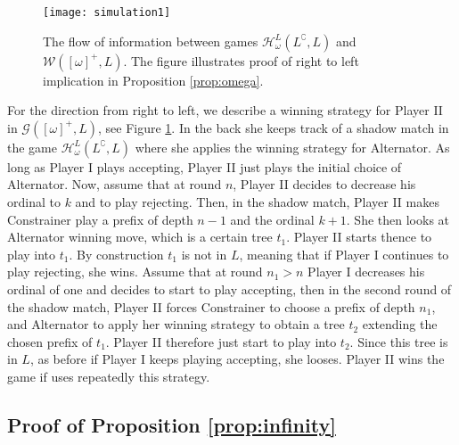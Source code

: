 \begin{figure}
\begin{center}
\texttt{[image: simulation1]}
\caption{The flow of information between games $\mathcal{H}^{L}_\omega(L^\complement, L)$ and $\mathcal{W}([\omega]^+, L)$. The figure illustrates proof of right to left implication in Proposition \ref{prop:omega}. 
\label{myfig1} }
\end{center}
\end{figure}


For the direction from right to left, we describe a winning strategy for Player II in $\mathcal{G}([\omega]^+, L)$, see Figure \ref{myfig1}. In the back she keeps track of a shadow match in the game $\mathcal{H}^{L}_\omega(L^\complement, L)$ where she applies the  winning strategy for Alternator. 
As long as Player I plays accepting, Player II just plays the initial choice of Alternator. Now, assume that at round $n$, Player II decides to decrease his ordinal to $k$ and to play rejecting. Then, in the shadow match, Player II makes Constrainer play a prefix of depth $n-1$ and the ordinal $k+1$. She then looks at Alternator winning move, which is a certain tree $t_1$. Player II starts thence to play into $t_1$. By construction $t_1$ is not in $L$, meaning that if Player I continues to play rejecting, she wins. Assume that at round $n_1> n$ Player I decreases his ordinal of one and decides to start to play accepting, then in the second round of the shadow match, Player II forces Constrainer to choose a prefix of depth $n_1$, and Alternator to apply her winning strategy to obtain a tree $t_2$ extending the chosen prefix of $t_1$. Player II therefore just start to play into $t_2$. Since this tree is in $L$, as before if Player I keeps playing accepting, she looses. Player II wins the game if uses repeatedly this strategy. 


\subsection*{Proof of Proposition \ref{prop:infinity}}


